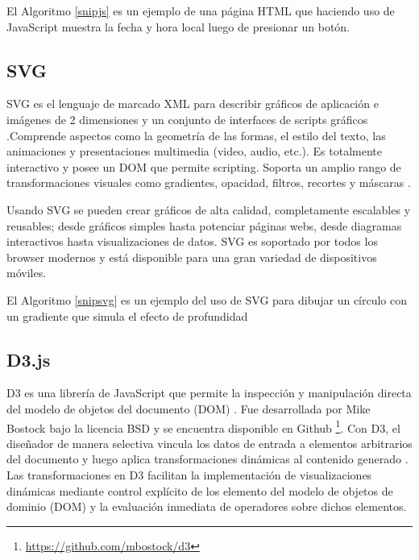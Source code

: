 El Algoritmo \ref{snipjs} es un ejemplo de una página HTML que haciendo uso de JavaScript muestra la fecha y hora local luego de presionar un botón.



\subsection{SVG}

SVG es el lenguaje de marcado XML para describir gráficos de aplicación e imágenes de 2 dimensiones y un conjunto de interfaces de scripts gráficos \cite{Svg10}.Comprende aspectos como la geometría de las formas, el estilo del texto, las animaciones y presentaciones multimedia (video, audio, etc.). Es totalmente interactivo y posee un DOM que permite scripting. Soporta un amplio rango de transformaciones visuales como gradientes, opacidad, filtros, recortes y máscaras \cite{Gra13}.

Usando SVG se pueden crear gráficos de alta calidad, completamente escalables y reusables; desde gráficos simples hasta potenciar páginas webs, desde diagramas interactivos hasta visualizaciones de datos. SVG es soportado por todos los browser modernos y está disponible para una gran variedad de dispositivos móviles.

El Algoritmo \ref{snipsvg} es un ejemplo del uso de SVG para dibujar un círculo con un gradiente que simula el efecto de profundidad


\subsection{D3.js}

D3 es una librería de JavaScript que permite la inspección y manipulación directa del modelo de objetos del documento (DOM) \cite{D3JS}. Fue desarrollada por Mike Bostock bajo la licencia BSD y se encuentra disponible en Github \footnote{\url{https://github.com/mbostock/d3}}. Con D3, el diseñador de manera selectiva vincula los datos de entrada a elementos arbitrarios del documento y luego aplica transformaciones dinámicas al contenido generado \cite{Bos11}. Las transformaciones en D3 facilitan la implementación de visualizaciones dinámicas mediante control explícito de los elemento del modelo de objetos de dominio (DOM) y la evaluación inmediata de operadores sobre dichos elementos.

